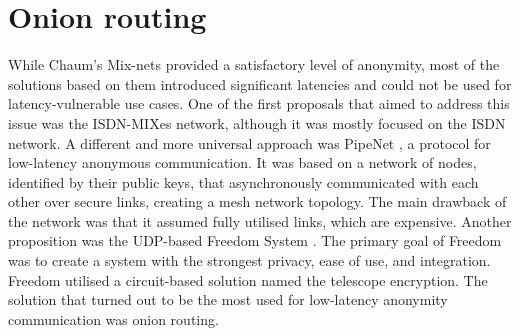\section{Onion routing}
While Chaum's Mix-nets provided a satisfactory level of anonymity, most of the solutions based on them introduced significant latencies and could not be used for latency-vulnerable use cases. One of the first proposals that aimed to address this issue was the ISDN-MIXes network, although it was mostly focused on the ISDN network. A different and more universal approach was PipeNet \cite{pipenet}, a protocol for low-latency anonymous communication. It was based on a network of nodes, identified by their public keys, that asynchronously communicated with each other over secure links, creating a mesh network topology. The main drawback of the network was that it assumed fully utilised links, which are expensive.
Another proposition was the UDP-based Freedom System \cite{freedom}. The primary goal of Freedom was to create a system with the strongest privacy, ease of use, and integration. Freedom utilised a circuit-based solution named  the telescope encryption.
The solution that turned out to be the most used for low-latency anonymity communication was onion routing.

